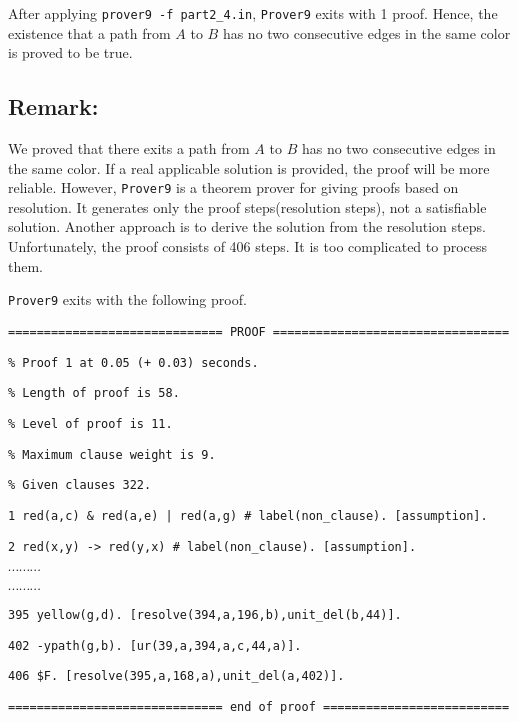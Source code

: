 \vspace{2mm}

After applying {\tt prover9 -f part2\_4.in}, {\tt Prover9} exits with 1 proof. Hence, the existence that a path from $A$ to $B$ has no two consecutive edges in the same color is proved to be true.

\subsection*{Remark:}
We proved that there exits a path from $A$ to $B$ has no two consecutive edges in the same color. If a real applicable solution is provided, the proof will be more reliable. However, {\tt Prover9} is a theorem prover for giving proofs based on resolution. It generates only the proof steps(resolution steps), not a satisfiable solution. Another approach is to derive the solution from the resolution steps. Unfortunately, the proof consists of 406 steps. It is too complicated to process them.  

{\tt Prover9} exits with the following proof.

\vspace{3mm}

{\footnotesize

{\tt ============================== PROOF =================================}

{\tt \% Proof 1 at 0.05 (+ 0.03) seconds.}

{\tt \% Length of proof is 58.}

{\tt \% Level of proof is 11.}

{\tt \% Maximum clause weight is 9.}

{\tt \% Given clauses 322.}

{\tt 1 red(a,c) \& red(a,e) | red(a,g) \# label(non\_clause).  [assumption].}

{\tt 2 red(x,y) -> red(y,x) \# label(non\_clause).  [assumption].}

$\cdots \cdots \cdots$

$\cdots \cdots \cdots$

{\tt 395 yellow(g,d).  [resolve(394,a,196,b),unit\_del(b,44)].}

{\tt 402 -ypath(g,b).  [ur(39,a,394,a,c,44,a)].}

{\tt 406 \$F.  [resolve(395,a,168,a),unit\_del(a,402)].}

{\tt ============================== end of proof ==========================}

}

\vspace{2mm}

